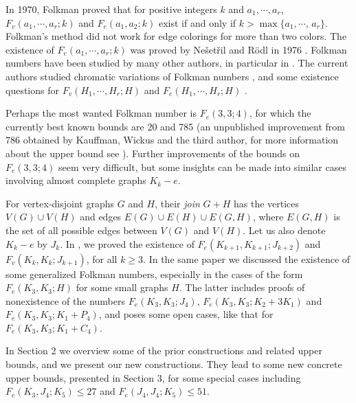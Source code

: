 \documentclass{article}[12pt]
\begin{document}
\medskip
In 1970, Folkman \cite{Folkman} proved that
for positive integers $k$ and $a_1, \cdots, a_r$,
$F_v (a_1, \cdots, a_r; k)$  and $F_e (a_1, a_2; k)$
exist if and only if $k > \max \{a_1, \cdots$, $a_r\}$.
Folkman's method did not work for
edge colorings for more than two colors.
The existence of $F_e(a_1, \cdots, a_r; k)$
was proved by Ne\v{s}et\v{r}il and R\"{o}dl
in 1976 \cite{NesetrilRodl}.
Folkman numbers have been studied by many
other authors, in particular in
\cite{drr14,RT,Nkolev2008,LiLin2017a,
LinLi2012a,RodlRS,XuShao2010a,XLSW}.
The current authors studied chromatic variations
of Folkman numbers \cite{XLR0}, and some
existence questions for
$F_v(H_1, \cdots, H_r;H)$ and $F_e(H_1, \cdots, H_r;H)$
\cite{XLR1}.

Perhaps the most wanted Folkman number is $F_e(3,3;4)$,
for which the currently best known bounds are 20
\cite{BikovNenov2016a} and 785 (an unpublished
improvement from 786 obtained by Kauffman, Wickus and the third
author, for more information about the upper bound see
\cite{XLR1}). Further improvements of the
bounds on $F_e(3,3;4)$ seem very difficult,
but some insights can be made into similar
cases involving almost complete graphs $K_k-e$.

For vertex-disjoint graphs $G$ and $H$, their {\em join}
$G+H$ has the vertices $V(G) \cup V(H)$ and edges
$E(G) \cup E(H) \cup E(G,H)$, where $E(G,H)$ is the set
of all possible edges between $V(G)$ and $V(H)$.
Let us also denote $K_k-e$ by $J_k$.
In \cite{XLR1}, we proved
the existence of
$F_e(K_{k+1},K_{k+1};J_{k+2})$ and
$F_v(K_k,K_k;J_{k+1})$, for all $k \ge 3$.
In the same paper we discussed the existence
of some generalized Folkman numbers, especially
in the cases of the form $F_e(K_3,K_3;H)$ for some
small graphs $H$. The latter
includes proofs of nonexistence of the numbers
$F_e(K_3,K_3;J_4)$, $F_e(K_3,K_3;K_2+3K_1)$ and
$F_e(K_3,K_3;K_1+P_4)$, and poses some open cases,
like that for $F_e(K_3,K_3;K_1+C_4)$.

In Section 2 we overview some of the prior constructions
and related upper bounds, and we present our new
constructions. They lead to some new concrete upper bounds,
presented in Section 3, for some special cases including
$F_e(K_3,J_4; K_5) \leq 27$ and
$F_e(J_4,J_4; K_5) \leq 51$.



\end{document}
